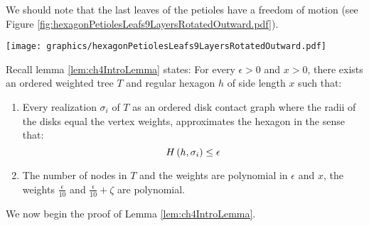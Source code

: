 
We should note that the last leaves of the petioles have a freedom of motion (see Figure \ref{fig:hexagonPetiolesLeafs9LayersRotatedOutward.pdf}).  

\begin{minipage}{\linewidth}
\begin{center}
\texttt{[image: graphics/hexagonPetiolesLeafs9LayersRotatedOutward.pdf]}
\label{fig:hexagonPetiolesLeafs9LayersRotatedOutward.pdf}
\end{center}
\end{minipage}

Recall lemma \ref{lem:ch4IntroLemma} states:\newline
For every $\epsilon > 0$ and $x>0$, there exists an ordered weighted tree $T$ and regular hexagon $h$ of side length $x$ such that:
\begin{enumerate}
\item Every realization $\sigma_i$ of $T$ as an ordered disk contact graph where the radii of the disks equal the vertex weights, approximates the hexagon in the sense that:
$$H\left( h,\sigma_i \right)\leq\epsilon$$
\item The number of nodes in $T$ and the weights are polynomial in $\epsilon$ and $x$, the weights $\frac{\epsilon}{10}$ and $\frac{\epsilon}{10} + \zeta$ are polynomial.
\end{enumerate}
We now begin the proof of Lemma \ref{lem:ch4IntroLemma}.

